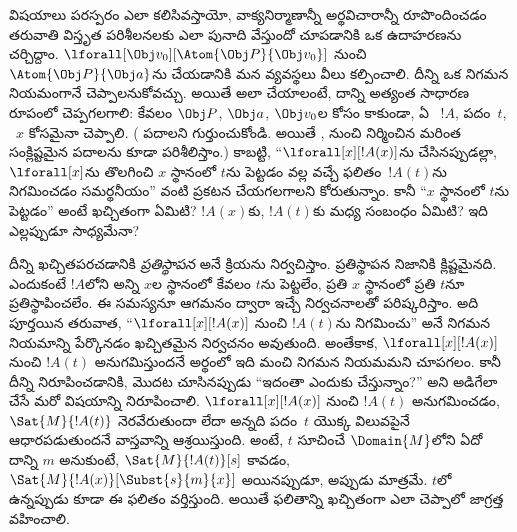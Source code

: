 \documentclass[../../../include/open-logic-section]{subfiles}
\begin{document}


విషయాలు పరస్పరం ఎలా కలిసివస్తాయో, వాక్యనిర్మాణాన్నీ అర్థవిచారాన్నీ రూపొందించడం తరువాతి విస్తృత
పరిశీలనలకు ఎలా పునాది వేస్తుందో చూపడానికి ఒక
ఉదాహరణను చర్చిద్దాం. $\lforall[\Obj v_0][\Atom{\Obj P}{\Obj v_0}]$
నుంచి $\Atom{\Obj P}{\Obj a}$ను  చేయడానికి మన
 వ్యవస్థలు వీలు కల్పించాలి. దీన్ని ఒక నిగమన నియమంగానే
చెప్పాలనుకోవచ్చు. అయితే అలా చేయాలంటే, దాన్ని అత్యంత
సాధారణ రూపంలో చెప్పగలగాలి: కేవలం $\Obj P$, $\Obj a$, $\Obj v_0$ల
కోసం కాకుండా, ఏ ~$!A$, పదం~$t$, ~$x$ కోసమైనా
చెప్పాలి. ( పదాలని గుర్తుంచుకోండి. అయితే
,  నుంచి నిర్మించిన మరింత సంక్లిష్టమైన
పదాలను కూడా పరిశీలిస్తాం.) కాబట్టి, ``$\lforall[x][!A(x)]$ను
 చేసినప్పుడల్లా, $\lforall[x]$ను తొలగించి $x$ స్థానంలో
$t$ను పెట్టడం వల్ల వచ్చే ఫలితం~$!A(t)$ను నిగమించడం సమర్థనీయం'' వంటి
ప్రకటన చేయగలగాలని కోరుతున్నాం. కానీ ``$x$ స్థానంలో $t$ను పెట్టడం''
అంటే ఖచ్చితంగా ఏమిటి? $!A(x)$కు, $!A(t)$కు మధ్య సంబంధం ఏమిటి? ఇది
ఎల్లప్పుడూ సాధ్యమేనా?

దీన్ని ఖచ్చితపరచడానికి \emph{ప్రతిస్థాపన} అనే క్రియను నిర్వచిస్తాం.
ప్రతిస్థాపన నిజానికి క్లిష్టమైనది. ఎందుకంటే $!A$లోని అన్ని $x$ల
స్థానంలో కేవలం $t$ను పెట్టలేం, ప్రతి $x$ స్థానంలో ప్రతి $t$నూ
ప్రతిస్థాపించలేం. ఈ సమస్యనూ ఆగమనం ద్వారా ఇచ్చే నిర్వచనాలతో పరిష్కరిస్తాం.
అది పూర్తయిన తరువాత, ``$\lforall[x][!A(x)]$ నుంచి $!A(t)$ను
నిగమించు'' అనే నిగమన నియమాన్ని పేర్కొనడం ఖచ్చితమైన నిర్వచనం
అవుతుంది. అంతేకాక, $\lforall[x][!A(x)]$ నుంచి $!A(t)$
అనుగమిస్తుందనే అర్థంలో ఇది మంచి నిగమన నియమమని చూపగలం. కానీ దీన్ని
నిరూపించడానికి, మొదట చూసినప్పుడు ``ఇదంతా ఎందుకు చేస్తున్నాం?'' అని
అడిగేలా చేసే మరో విషయాన్ని నిరూపించాలి. $\lforall[x][!A(x)]$ నుంచి
$!A(t)$ అనుగమించడం, $\Sat{M}{!A(t)}$ నెరవేరుతుందా లేదా అన్నది
పదం~$t$ యొక్క విలువపైనే ఆధారపడుతుందనే వాస్తవాన్ని ఆశ్రయిస్తుంది.
అంటే, $t$ సూచించే $\Domain{M}$లోని  ఏదో దాన్ని $m$
అనుకుంటే, $\Sat{M}{!A(t)}[s]$ కావడం,
$\Sat{M}{!A(x)}[\Subst{s}{m}{x}]$ అయినప్పుడూ, అప్పుడు మాత్రమే.
$t$లో  ఉన్నప్పుడు కూడా ఈ ఫలితం వర్తిస్తుంది. అయితే ఫలితాన్ని
ఖచ్చితంగా ఎలా చెప్పాలో జాగ్రత్త వహించాలి.
\end{document}
